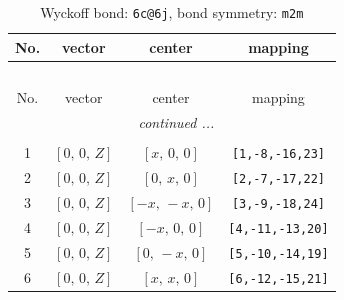 \documentclass[fleqn,8pt]{jsarticle}
\begin{document}
\begin{longtable}{cccc}
\caption{Wyckoff bond: {\tt 6c@6j}, bond symmetry: {\tt m2m}}
 \\
 \hline \hline
No. & vector & center & mapping \\ \hline \endfirsthead

\multicolumn{3}{l}{\tablename\ \thetable{}} \\
 \hline \hline
No. & vector & center & mapping \\ \hline \endhead

 \hline \hline
\multicolumn{3}{r}{\footnotesize\it continued ...} \\ \endfoot

 \hline \hline
\multicolumn{3}{r}{} \\ \endlastfoot

1 & $\left[ 0,\, 0,\, Z \right]$ & $\left[ x,\, 0,\, 0 \right]$ & {\tt [1,-8,-16,23]} \\ \hline
2 & $\left[ 0,\, 0,\, Z \right]$ & $\left[ 0,\, x,\, 0 \right]$ & {\tt [2,-7,-17,22]} \\ \hline
3 & $\left[ 0,\, 0,\, Z \right]$ & $\left[ - x,\, - x,\, 0 \right]$ & {\tt [3,-9,-18,24]} \\ \hline
4 & $\left[ 0,\, 0,\, Z \right]$ & $\left[ - x,\, 0,\, 0 \right]$ & {\tt [4,-11,-13,20]} \\ \hline
5 & $\left[ 0,\, 0,\, Z \right]$ & $\left[ 0,\, - x,\, 0 \right]$ & {\tt [5,-10,-14,19]} \\ \hline
6 & $\left[ 0,\, 0,\, Z \right]$ & $\left[ x,\, x,\, 0 \right]$ & {\tt [6,-12,-15,21]} \\
\end{longtable}
\renewcommand{\arraystretch}{1.2}
\end{document}
